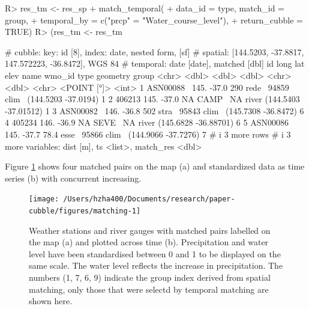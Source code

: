 \documentclass[
  shortnames]{jss}
\begin{document}
\begin{CodeChunk}
\begin{CodeInput}
R> res_tm <- res_sp %
+   match_temporal(
+     data_id = type, match_id = group,
+     temporal_by = c("prcp" = "Water_course_level"),
+     return_cubble = TRUE)
R> (res_tm <- res_tm %
\end{CodeInput}
\begin{CodeOutput}
# cubble:   key: id [8], index: date, nested form, [sf]
# spatial:  [144.5203, -37.8817, 147.572223, -36.8472], WGS 84
# temporal: date [date], matched [dbl]
  id         long   lat  elev name  wmo_id type              geometry group
  <chr>     <dbl> <dbl> <dbl> <chr>  <dbl> <chr>          <POINT [°]> <int>
1 ASN00088~  145. -37.0 290   rede~  94859 clim~  (144.5203 -37.0194)     1
2 406213     145. -37.0  NA   CAMP~     NA river (144.5403 -37.01512)     1
3 ASN00082~  146. -36.8 502   stra~  95843 clim~  (145.7308 -36.8472)     6
4 405234     146. -36.9  NA   SEVE~     NA river (145.6828 -36.88701)     6
5 ASN00086~  145. -37.7  78.4 esse~  95866 clim~  (144.9066 -37.7276)     7
# i 3 more rows
# i 3 more variables: dist [m], ts <list>, match_res <dbl>
\end{CodeOutput}
\end{CodeChunk}

Figure \ref{fig:matching} shows four matched pairs on the map (a) and standardized data as time series (b) with concurrent increasing.

\begin{CodeChunk}
\begin{figure}

{\centering \texttt{[image: /Users/hzha400/Documents/research/paper-cubble/figures/matching-1]} 

}

\caption[Weather stations and river gauges with matched pairs labelled on the map (a) and plotted across time (b)]{Weather stations and river gauges with matched pairs labelled on the map (a) and plotted across time (b). Precipitation and water level have been standardised between 0 and 1 to be displayed on the same scale. The water level reflects the increase in precipitation. The numbers (1, 7, 6, 9) indicate the group index derived from spatial matching, only those that were selectd by temporal matching are shown here.}\label{fig:matching}
\end{figure}
\end{CodeChunk}
\end{document}
